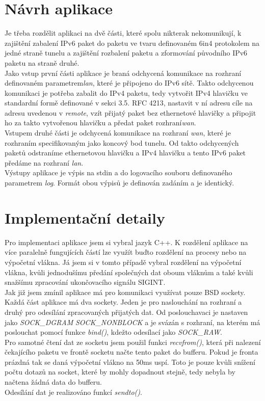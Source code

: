 \documentclass[12pt,a4paper,onecolumn]{article}
\begin{document}
\section{Návrh aplikace}
Je třeba rozdělit aplikaci na dvě části, které spolu nikterak nekomunikují, k zajištění
zabalení IPv6 paket do paketu ve tvaru definovaném 6in4 protokolem na jedné straně tunelu a
zajištění rozbalení paketu a zformování původního IPv6 paketu na straně druhé.\\
\indent Jako vstup první části aplikace je braná odchycená komunikace na rozhraní definovaném
parametrem\textit{lan}, které je připojeno do IPv6 sítě. Takto odchycenou komunikaci je potřeba
zabalit do IPv4 paketu, tedy vytvořit IPv4 hlavičku ve standardní formě definované v sekci 3.5.
RFC 4213, nastavit v ní adresu cíle na adresu uvedenou v \textit{remote}, vzít přijatý paket bez
ethernetové hlavičky a připojit ho za takto vytvořenou hlavičku a předat paket
rozhraní\textit{wan}.\\
\indent Vstupem druhé části je odchycená komunikace na rozhraní \textit{wan}, které je rozhraním
specifikovaným jako koncový bod tunelu. Od takto odchycených paketů odstraníme ethernetovou
hlavičku a IPv4 hlavičku a tento IPv6 paket předáme na rozhraní \textit{lan}.\\
\indent Výstupy aplikace je výpis na stdin a do logovacího souboru definovaného parametrem
\textit{log}. Formát obou výpisů je definován zadáním a je identický.

\section{Implementační detaily}
Pro implementaci aplikace jsem si vybral jazyk C++. K rozdělení aplikace na více paralelně
fungujících částí lze využít buďto rozdělení na procesy nebo na výpočetní vlákna. Já jsem si v
tomto případě vybral rozdělení na výpočetní vlákna, kvůli jednodušímu předání společných dat oboum
vláknům a také kvůli snažšímu zpracování ukončovacího signálu SIGINT.\\
\indent Jak již jsem zmínil aplikace má pro komunikaci využívat pouze BSD sockety. Každá část
aplikace má dva sockety. Jeden je pro naslouchání na rozhraní a druhý pro odesílání zpracovaných
přijatých dat. Od poslouchavaci je nastaven jako \textit{SOCK\_DGRAM} \textbar
\textit{ SOCK\_NONBLOCK} a je svázán s rozhraní, na kterém má poslouchat pomocí funkce
\textit{bind()}, kdežto odesílací jako \textit{SOCK\_RAW}.\\
\indent Pro samotné čtení dat ze socketu jsem použil funkci \textit{recvfrom()}, která při
nalezení čekajícího paketu ve frontě socketu načte tento paket do bufferu. Pokud je fronta prázdná
tak se daná výpočetní vlákno na 50ms uspí. Toto je pouze kvůli snížení počtu dotazů na socket,
které by mohly dopadnout stejně, tedy nebyla by načtena žádná data do bufferu.\\
\indent Odesílání dat je realizováno funkcí \textit{sendto()}.
\end{document}
